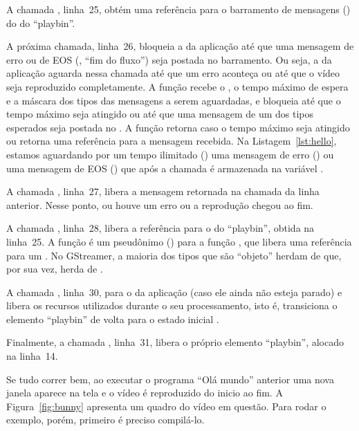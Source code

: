 \documentclass{SBCbookchapter}
\begin{document}
A chamada , linha~25, obtém uma referência para o
barramento de mensagens () do  do ``playbin''.

A próxima chamada, linha~26, bloqueia a  da aplicação até que uma
mensagem de erro ou de EOS (, ``fim do fluxo'') seja
postada no barramento.  Ou seja, a  da aplicação aguarda nessa
chamada até que um erro aconteça ou até que o vídeo seja reproduzido
completamente.  A função  recebe o , o
tempo máximo de espera e a máscara dos tipos das mensagens a serem
aguardadas, e bloqueia até que o tempo máximo seja atingido ou até que uma
mensagem de um dos tipos esperados seja postada no .  A função
retorna  caso o tempo máximo seja atingido ou retorna uma referência
para a mensagem recebida.  Na Listagem~\ref{lst:hello}, estamos aguardando
por um tempo ilimitado () uma mensagem de erro
() ou uma mensagem de EOS () que
após a chamada é armazenada na variável .

A chamada , linha~27, libera a mensagem retornada na
chamada da linha anterior.  Nesse ponto, ou houve um erro ou a reprodução
chegou ao fim.

A chamada , linha~28, libera a referência para o
 do ``playbin'', obtida na linha~25.  A função  é
um pseudônimo () para a função , que libera uma
referência para um .  No GStreamer, a maioria dos tipos que são
``objeto'' herdam  de  que, por sua vez, herda de .

A chamada , linha~30, para o  da
aplicação (caso ele ainda não esteja parado) e libera os recursos utilizados
durante o seu processamento, isto é, transiciona o elemento ``playbin'' de
volta para o estado inicial .

Finalmente, a chamada , linha~31, libera o próprio
elemento ``playbin'', alocado na linha~14.

Se tudo correr bem, ao executar o programa ``Olá mundo'' anterior uma nova
janela aparece na tela e o vídeo é reproduzido do inicio ao fim.
A Figura~\ref{fig:bunny} apresenta um quadro do vídeo em questão.  Para
rodar o exemplo, porém, primeiro é preciso compilá-lo.
\end{document}
